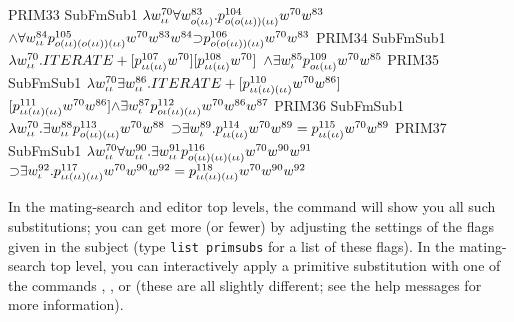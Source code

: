 \begin{tpsexample}
     PRIM33   SubFmSub1   \(\lambda w \sp{{70}}\sb{\iota\iota}   \forall w \sp{{83}}\sb{o(\iota\iota)} .p \sp{{104}}\sb{o(o(\iota\iota))(\iota\iota)}  w \sp{{70}}  w \sp{{83}}  \)
               \(\land  \forall w \sp{{84}}\sb{\iota\iota}  p \sp{{105}}\sb{o(\iota\iota)(o(\iota\iota))(\iota\iota)}  w \sp{{70}}  w \sp{{83}}  w \sp{{84}}  \mathord{\supset} p \sp{{106}}\sb{o(o(\iota\iota))(\iota\iota)}  w \sp{{70}}  w \sp{{83}}\)
     PRIM34   SubFmSub1   \(\lambda w \sp{{70}}\sb{\iota\iota} .ITERATE+ [p \sp{{107}}\sb{\iota\iota(\iota\iota)}  w \sp{{70}} ] [p \sp{{108}}\sb{\iota\iota(\iota\iota)}  w \sp{{70}} ] \)
               \(\land  \exists w \sp{{85}}\sb{\iota}  p \sp{{109}}\sb{o\iota(\iota\iota)}  w \sp{{70}}  w \sp{{85}}\)
     PRIM35   SubFmSub1   \(\lambda w \sp{{70}}\sb{\iota\iota}   \exists w \sp{{86}}\sb{\iota\iota} .ITERATE+ [p \sp{{110}}\sb{\iota\iota(\iota\iota)(\iota\iota)}  w \sp{{70}}  w \sp{{86}} ] \)
               \([p \sp{{111}}\sb{\iota\iota(\iota\iota)(\iota\iota)}  w \sp{{70}}  w \sp{{86}} ] \mathord{\wedge}  \exists w \sp{{87}}\sb{\iota}  p \sp{{112}}\sb{o\iota(\iota\iota)(\iota\iota)}  w \sp{{70}}  w \sp{{86}}  w \sp{{87}}\)
     PRIM36   SubFmSub1   \(\lambda w \sp{{70}}\sb{\iota\iota} . \exists w \sp{{88}}\sb{\iota\iota}  p \sp{{113}}\sb{o(\iota\iota)(\iota\iota)}  w \sp{{70}}  w \sp{{88}}  \)
               \(\mathord{\supset}  \exists w \sp{{89}}\sb{\iota} .p \sp{{114}}\sb{\iota\iota(\iota\iota)}  w \sp{{70}}  w \sp{{89}}  = p \sp{{115}}\sb{\iota\iota(\iota\iota)}  w \sp{{70}}  w \sp{{89}}\)
     PRIM37   SubFmSub1   \(\lambda w \sp{{70}}\sb{\iota\iota}   \forall w \sp{{90}}\sb{\iota\iota} . \exists w \sp{{91}}\sb{\iota\iota}  p \sp{{116}}\sb{o(\iota\iota)(\iota\iota)(\iota\iota)}  w \sp{{70}}  w \sp{{90}}  w \sp{{91}}  \)
               \(\mathord{\supset}  \exists w \sp{{92}}\sb{\iota} .p \sp{{117}}\sb{\iota\iota(\iota\iota)(\iota\iota)}  w \sp{{70}}  w \sp{{90}}  w \sp{{92}}  = p \sp{{118}}\sb{\iota\iota(\iota\iota)(\iota\iota)}  w \sp{{70}}  w \sp{{90}}  w \sp{{92}}\)
\end{tpsexample}

In the mating-search and editor top levels, the command
 will show you all such substitutions; you can get more
(or fewer) by adjusting the settings of the flags given in the subject 
(type {\tt list primsubs} for a list of these flags). In the mating-search top level,
you can interactively apply a primitive substitution with one of the commands
, , 
or  (these are all slightly different; see the help messages
for more information).

